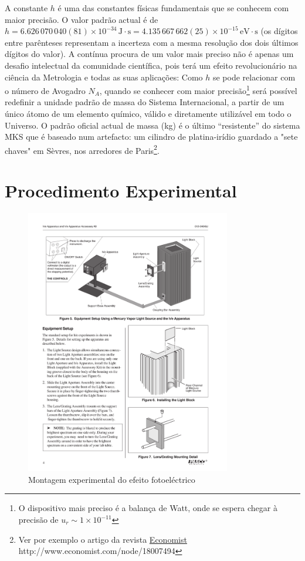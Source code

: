 \documentclass[a4paper,12pt]{article}  %
\begin{document}
A constante $h$ é uma das constantes físicas fundamentais que se conhecem com maior precisão.
O valor padrão actual é de $h=6.626\,070\,040(81) \times 10^{-34}\,\textrm{J}\cdot \textrm{s}=4.135\,667\,662(25)\times 10^{-15}\,\textrm{eV}\cdot\textrm{s}$ (os  dígitos entre parênteses representam a incerteza com a mesma resolução dos dois últimos dígitos do valor).  A contínua procura de um valor mais preciso não é apenas um  desafio intelectual da comunidade científica, pois  terá um efeito  revolucionário na ciência da Metrologia e todas as suas aplicações: 
 Como $h$ se pode relacionar com o número de Avogadro  $N_A$, quando se conhecer com maior precisão\footnote{O dispositivo mais preciso é a balança de Watt, onde se espera chegar à precisão de $u_r \sim 1\times 10^{-11}$} será possível redefinir a unidade padrão de massa do Sistema Internacional, a partir de um único átomo de um elemento químico, válido e diretamente utilizável em todo o Universo. 
 O padrão oficial actual de massa (kg) é o último ``resistente''  do sistema MKS que é baseado num artefacto: um cilindro de platina-irídio guardado a "sete chaves" em Sèvres, nos arredores de Paris\footnote{Ver por exemplo o artigo da revista \href{http://www.economist.com/node/18007494}{Economist} http://www.economist.com/node/18007494}.   
 
\section{\sf Procedimento Experimental}

\begin{figure}[htb] 
	\centering 
	\includegraphics[width=0.8\textwidth]{planckPasco} 
	\caption{Montagem experimental do efeito fotoeléctrico} 
	\label{fig:plackPasco}
\end{figure}
\end{document}
